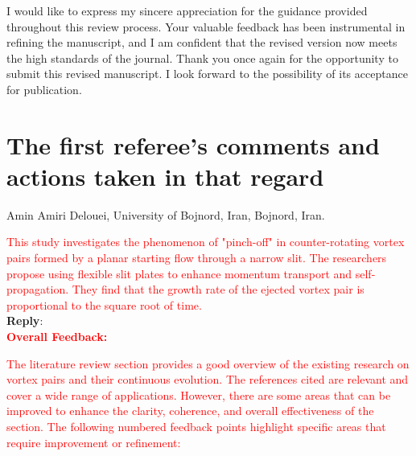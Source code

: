 \documentclass[onecolumn,a4paper,amsmath,amssym,pre]{revtex4}
\begin{document}
{{  I would like to express my sincere appreciation for the guidance provided throughout this review process. Your valuable feedback has been instrumental in refining the manuscript, and I am confident that the revised version now meets the high standards of the journal. Thank you once again for the opportunity to submit this revised manuscript. I look forward to the possibility of its acceptance for publication.  }
%
%
%
%
%
%
%
%

\newpage

\section*{\textbf{The first referee's comments and actions taken in that regard}}   
Amin Amiri Delouei, University of Bojnord, Iran, Bojnord, Iran.

\textcolor{red}{This study investigates the phenomenon of "pinch-off" in counter-rotating vortex pairs formed by a planar starting flow through a narrow slit. The researchers propose using flexible slit plates to enhance momentum transport and self-propagation. They find that the growth rate of the ejected vortex pair is proportional to the square root of time.}\\

\textbf{Reply}:\\


\textcolor{red}{\textbf{Overall Feedback:}}

\textcolor{red}{The literature review section provides a good overview of the existing research on vortex pairs and their continuous evolution. The references cited are relevant and cover a wide range of applications. However, there are some areas that can be improved to enhance the clarity, coherence, and overall effectiveness of the section. The following numbered feedback points highlight specific areas that require improvement or refinement:}

}
\end{document}
